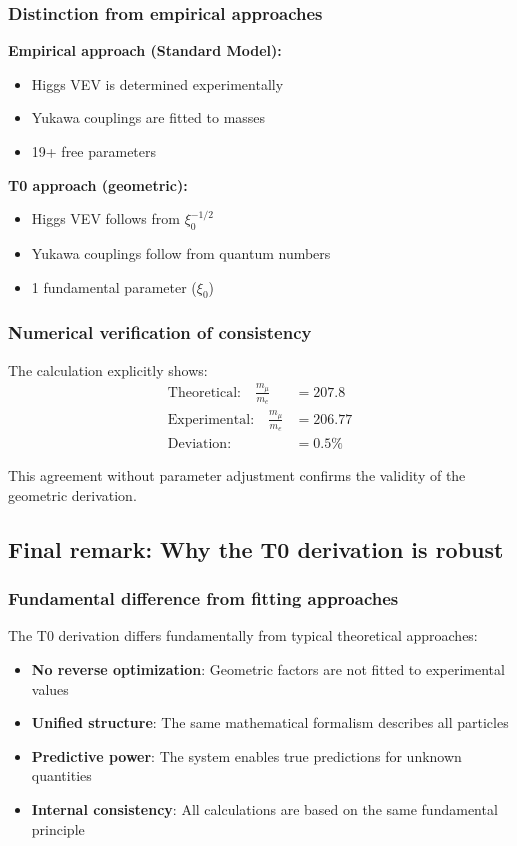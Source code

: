 \documentclass[12pt,a4paper]{article}
\begin{document}
\subsubsection{Distinction from empirical approaches}

\textbf{Empirical approach (Standard Model):}
\begin{itemize}
	\item Higgs VEV is determined experimentally
	\item Yukawa couplings are fitted to masses
	\item 19+ free parameters
\end{itemize}

\textbf{T0 approach (geometric):}
\begin{itemize}
	\item Higgs VEV follows from $\xi_0^{-1/2}$
	\item Yukawa couplings follow from quantum numbers
	\item 1 fundamental parameter ($\xi_0$)
\end{itemize}

\subsubsection{Numerical verification of consistency}

The calculation explicitly shows:
\begin{align}
	\text{Theoretical:} \quad \frac{m_\mu}{m_e} &= 207.8\\
	\text{Experimental:} \quad \frac{m_\mu}{m_e} &= 206.77\\
	\text{Deviation:} \quad &= 0.5\%
\end{align}

This agreement without parameter adjustment confirms the validity of the geometric derivation.

\subsection{Final remark: Why the T0 derivation is robust}

\subsubsection{Fundamental difference from fitting approaches}

The T0 derivation differs fundamentally from typical theoretical approaches:

\begin{itemize}
	\item \textbf{No reverse optimization}: Geometric factors are not fitted to experimental values
	\item \textbf{Unified structure}: The same mathematical formalism describes all particles
	\item \textbf{Predictive power}: The system enables true predictions for unknown quantities
	\item \textbf{Internal consistency}: All calculations are based on the same fundamental principle
\end{itemize}
\end{document}
